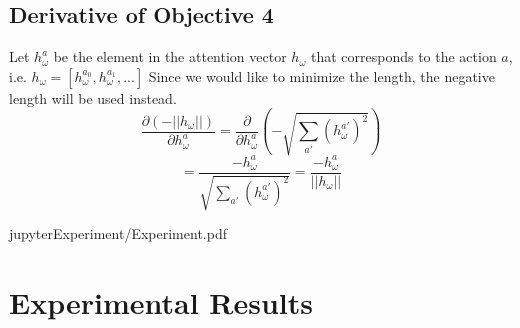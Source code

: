 \documentclass{article}
\begin{document}
	\subsection{Derivative of Objective 4}
	Let $h_\omega^a$ be the element in the attention vector $h_\omega$ that corresponds to the action $a$, i.e. $h_\omega = [h_\omega^{a_0}, h_\omega^{a_1}, ...]$
	Since we would like to minimize the length, the negative length will be used instead.
	$$\frac{\partial (-||h_\omega||)}{\partial h_\omega^a} = \frac{\partial}{\partial h_\omega^a} (-\sqrt{\sum_{a'} (h_\omega^{a'})^2})$$
	$$= \frac{-h_\omega^a}{\sqrt{\sum_{a'} (h_\omega^{a'})^2}} = \frac{-h_\omega^a}{||h_\omega||}$$
	
	{jupyterExperiment/Experiment.pdf}
	\section{Experimental Results}
\end{document}
